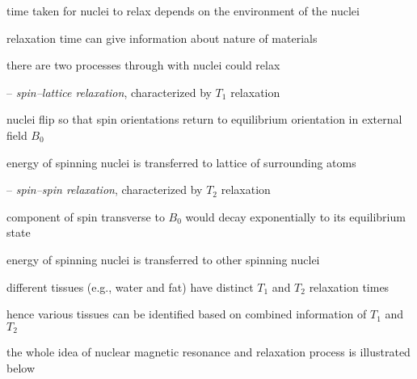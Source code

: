 time taken for nuclei to relax depends on the environment of the nuclei

relaxation time can give information about nature of materials

\cmt there are two processes through with nuclei could relax

\begin{compactitem}
	\item[--] \emph{spin–lattice relaxation}, characterized by $T_1$ relaxation
	
	nuclei flip so that spin orientations return to equilibrium orientation in external field $B_0$
	
	energy of spinning nuclei is transferred to lattice of surrounding atoms
	
	\item[--] \emph{spin–spin relaxation}, characterized by $T_2$ relaxation
	
	component of spin transverse to $B_0$ would decay exponentially to its equilibrium state
	
	energy of spinning nuclei is transferred to other spinning nuclei
\end{compactitem}

different tissues (e.g., water and fat) have distinct $T_1$ and $T_2$ relaxation times

hence various tissues can be identified based on combined information of $T_1$ and $T_2$

\vspace*{\baselineskip}

the whole idea of nuclear magnetic resonance and relaxation process is illustrated below

